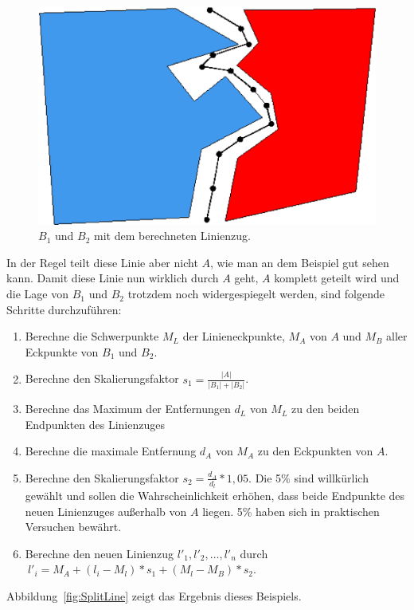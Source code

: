 \begin{figure}
	\centering
	\includegraphics[scale=0.6]{MittelpunktLinie.eps}
	\caption{$B_1$ und $B_2$ mit dem berechneten Linienzug.}
	\label{fig:MittelpunktLinie}
\end{figure}

In der Regel teilt diese Linie aber nicht $A$, wie man an dem Beispiel gut sehen kann. Damit diese Linie nun wirklich durch $A$ geht, $A$ komplett geteilt wird und die Lage von $B_1$ und $B_2$ trotzdem noch widergespiegelt werden, sind folgende Schritte durchzuführen:

\begin{enumerate}
\item Berechne die Schwerpunkte $M_L$ der Linieneckpunkte, $M_A$ von $A$ und $M_B$ aller Eckpunkte von $B_1$ und $B_2$.
\item Berechne den Skalierungsfaktor $s_1=\frac{|A|}{|B_1|+|B_2|}$. 
\item Berechne das Maximum der Entfernungen $d_L$ von $M_L$ zu den beiden Endpunkten des Linienzuges 
\item Berechne die maximale Entfernung $d_A$ von $M_A$ zu den Eckpunkten von $A$.
\item Berechne den Skalierungsfaktor $s_2=\frac{d_A}{d_l} * 1,05$. Die 5\% sind willkürlich gewählt und sollen die Wahrscheinlichkeit erhöhen, dass beide Endpunkte des neuen Linienzuges außerhalb von $A$ liegen. 5\% haben sich in praktischen Versuchen bewährt.
\item Berechne den neuen Linienzug $l'_1,l'_2,\hdots ,l'_n$ durch $\:l'_i=M_A+(l_i-M_l)*s_1+(M_l-M_B)*s_2$.
\end{enumerate}


Abbildung~\vref{fig:SplitLine} zeigt das Ergebnis dieses Beispiels. 

